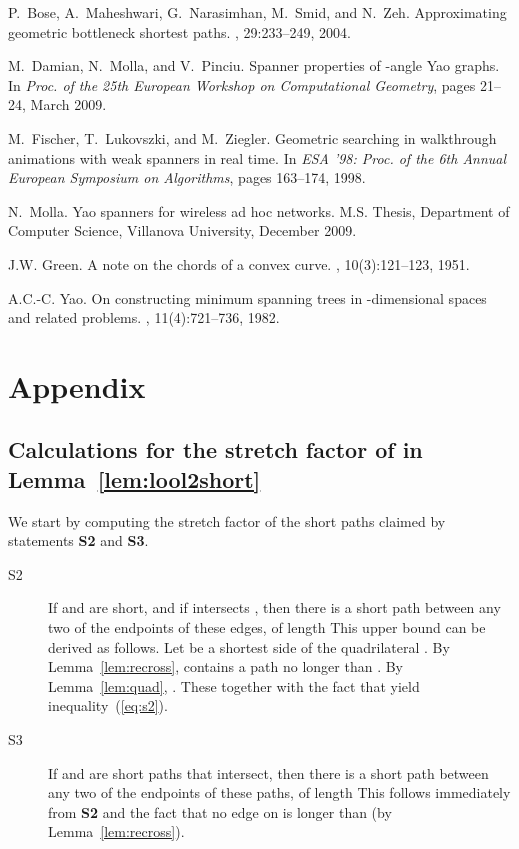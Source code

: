 \pdfoutput=1  \documentclass[11pt]{article}
\begin{document}
\def\cprime{}
\begin{thebibliography}{1}

P.~Bose, A.~Maheshwari, G.~Narasimhan, M.~Smid, and N.~Zeh.
\newblock Approximating geometric bottleneck shortest paths.
, 29:233--249,
  2004.

M.~Damian, N.~Molla, and V.~Pinciu.
\newblock Spanner properties of -angle Yao graphs.
\newblock In {\em Proc. of the 25th European Workshop on Computational
  Geometry}, pages 21--24, March 2009.

M.~Fischer, T.~Lukovszki, and M.~Ziegler.
\newblock Geometric searching in walkthrough animations with weak spanners in
  real time.
\newblock In {\em {ESA} '98: Proc. of the 6th Annual European Symposium on
  Algorithms}, pages 163--174, 1998.

N.~Molla.
\newblock Yao spanners for wireless ad hoc networks.
\newblock M.S. Thesis, Department of Computer Science, Villanova University, December 2009.

J.W. Green.
\newblock A note on the chords of a convex curve.
, 10(3):121--123, 1951.

A.C.-C. Yao.
\newblock On constructing minimum spanning trees in -dimensional spaces and
  related problems.
, 11(4):721--736, 1982.

\end{thebibliography}

\section{Appendix}
\label{sec:appendix}
\subsection{Calculations for the stretch factor of  in Lemma~\ref{lem:lool2short}}
We start by computing the stretch factor of the short paths claimed by statements {\bf S2}
and {\bf S3}.

\begin{description}
\item[S2]
If  and  are short, and if
 intersects , then there is a short path  between any two of the endpoints
of these edges, of length 
This upper bound can be derived as follows. Let  be a shortest side of
the quadrilateral . By Lemma~\ref{lem:recross}, 
contains a path  no longer than .
By Lemma~\ref{lem:quad}, .
These together with the fact that
 yield inequality~(\ref{eq:s2}).
\item[S3]
If  and  are short paths that intersect,
then there is a short path  between any two of the endpoints
of these paths, of length 
This follows immediately from {\bf S2} and the fact that
no edge on  is longer than  (by Lemma~\ref{lem:recross}).
\end{description}
\end{document}
